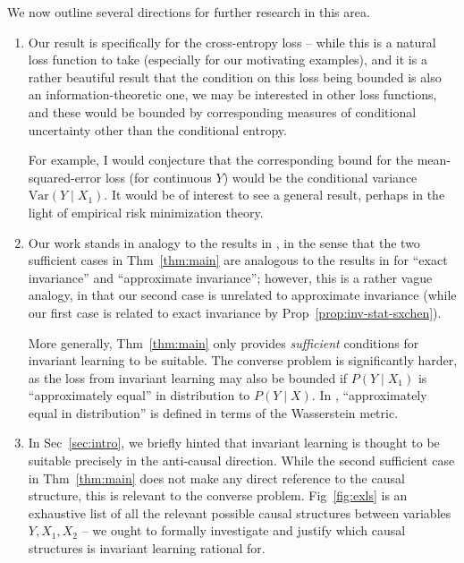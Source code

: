 \documentclass[12pt]{article}
\theoremstyle{definition}
\numberwithin{equation}{section}
\numberwithin{figure}{section}
\numberwithin{table}{section}
\begin{document}
We now outline several directions for further research in this area.

\begin{enumerate}

    \item Our result is specifically for the cross-entropy loss -- while this is a natural loss function to take (especially for our motivating examples), and it is a rather beautiful result that the condition on this loss being bounded is also an information-theoretic one, we may be interested in other loss functions, and these would be bounded by corresponding measures of conditional uncertainty other than the conditional entropy. 
    
    For example, I would conjecture that the corresponding bound for the mean-squared-error loss (for continuous $Y$) would be the conditional variance $\mathrm{Var}(Y\mid X_1)$. It would be of interest to see a general result, perhaps in the light of empirical risk minimization theory.
    
    \item Our work stands in analogy to the results in \cite{sxchen}, in the sense that the two sufficient cases in Thm~\ref{thm:main} are analogous to the results in \cite{sxchen} for ``exact invariance'' and ``approximate invariance''; however, this is a rather vague analogy, in that our second case is unrelated to approximate invariance (while our first case is related to exact invariance by Prop~\ref{prop:inv-stat-sxchen}).
    
    More generally, Thm~\ref{thm:main} only provides \emph{sufficient} conditions for invariant learning to be suitable. The converse problem is significantly harder, as the loss from invariant learning may also be bounded if $P(Y\mid X_1)$ is ``approximately equal'' in distribution to $P(Y\mid X)$. In \cite{sxchen}, ``approximately equal in distribution'' is defined in terms of the Wasserstein metric. 
    
    \item In Sec~\ref{sec:intro}, we briefly hinted that invariant learning is thought to be suitable precisely in the anti-causal direction. While the second sufficient case in Thm~\ref{thm:main} does not make any direct reference to the causal structure, this is relevant to the converse problem. Fig~\ref{fig:exls} is an exhaustive list of all the relevant possible causal structures between variables $Y, X_1, X_2$ -- we ought to formally investigate and justify which causal structures is invariant learning rational for.
    

\end{enumerate}
\end{document}
